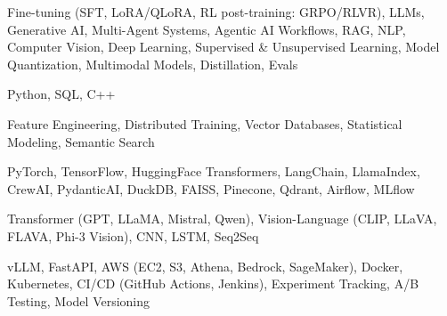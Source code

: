 \documentclass[letter,10pt]{article}
\begin{document}
 Fine-tuning (SFT, LoRA/QLoRA, RL post-training: GRPO/RLVR), LLMs, Generative AI, Multi-Agent Systems, Agentic AI Workflows, RAG, NLP, Computer Vision, Deep Learning, Supervised \& Unsupervised Learning, Model Quantization, Multimodal Models, Distillation, Evals\par\vspace{2pt}

 Python, SQL, C++\par\vspace{2pt}

 Feature Engineering, Distributed Training, Vector Databases, Statistical Modeling, Semantic Search\par\vspace{2pt}

 PyTorch, TensorFlow, HuggingFace Transformers, LangChain, LlamaIndex, CrewAI, PydanticAI, DuckDB, FAISS, Pinecone, Qdrant, Airflow, MLflow\par\vspace{2pt}

 Transformer (GPT, LLaMA, Mistral, Qwen), Vision-Language (CLIP, LLaVA, FLAVA, Phi-3 Vision), CNN, LSTM, Seq2Seq\par\vspace{2pt}

 vLLM, FastAPI, AWS (EC2, S3, Athena, Bedrock, SageMaker), Docker, Kubernetes, CI/CD (GitHub Actions, Jenkins), Experiment Tracking, A/B Testing, Model Versioning
\end{document}

